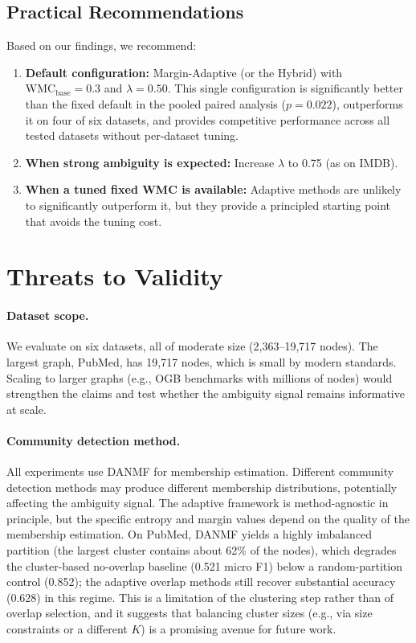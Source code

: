 \documentclass[a4paper,11pt,oneside,onecolumn,preprint]{elsarticle}
\numberwithin{equation}{section}
\begin{document}
\subsection{Practical Recommendations}

Based on our findings, we recommend:

\begin{enumerate}
  \item \textbf{Default configuration:} Margin-Adaptive (or the Hybrid) with $\mathrm{WMC}_{\mathrm{base}} = 0.3$ and $\lambda = 0.50$. This single configuration is significantly better than the fixed default in the pooled paired analysis ($p=0.022$), outperforms it on four of six datasets, and provides competitive performance across all tested datasets without per-dataset tuning.
  \item \textbf{When strong ambiguity is expected:} Increase $\lambda$ to 0.75 (as on IMDB).
  \item \textbf{When a tuned fixed WMC is available:} Adaptive methods are unlikely to significantly outperform it, but they provide a principled starting point that avoids the tuning cost.
\end{enumerate}


\section{Threats to Validity}
\label{sec:threats}

\paragraph{Dataset scope.}
We evaluate on six datasets, all of moderate size (2,363--19,717 nodes).
The largest graph, PubMed, has 19,717 nodes, which is small by modern standards.
Scaling to larger graphs (e.g., OGB benchmarks with millions of nodes) would strengthen the claims and test whether the ambiguity signal remains informative at scale.

\paragraph{Community detection method.}
All experiments use DANMF for membership estimation.
Different community detection methods may produce different membership distributions, potentially affecting the ambiguity signal.
The adaptive framework is method-agnostic in principle, but the specific entropy and margin values depend on the quality of the membership estimation.
On PubMed, DANMF yields a highly imbalanced partition (the largest cluster contains about 62\% of the nodes), which degrades the cluster-based no-overlap baseline (0.521 micro F1) below a random-partition control (0.852); the adaptive overlap methods still recover substantial accuracy (0.628) in this regime.
This is a limitation of the clustering step rather than of overlap selection, and it suggests that balancing cluster sizes (e.g., via size constraints or a different $K$) is a promising avenue for future work.
\end{document}

